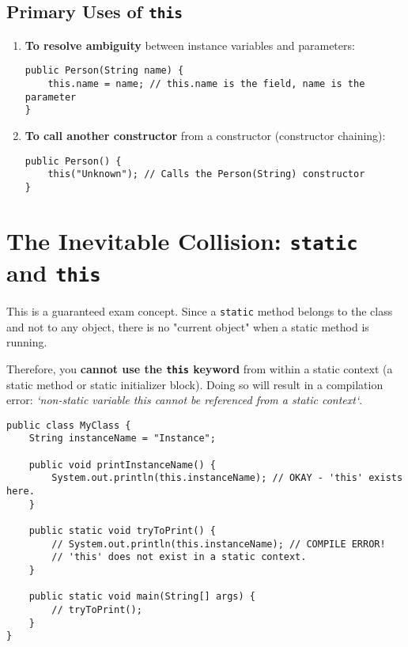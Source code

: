 \documentclass[12pt]{article}
\begin{document}
\begin{enumerate}[label=(\arabic*)]
\subsection*{Primary Uses of \texttt{this}}
\begin{enumerate}
    \item \textbf{To resolve ambiguity} between instance variables and parameters:
    \begin{verbatim}
public Person(String name) {
    this.name = name; // this.name is the field, name is the parameter
}
    \end{verbatim}
    \item \textbf{To call another constructor} from a constructor (constructor chaining):
    \begin{verbatim}
public Person() {
    this("Unknown"); // Calls the Person(String) constructor
}
    \end{verbatim}
\end{enumerate}

\section{The Inevitable Collision: \texttt{static} and \texttt{this}}
This is a guaranteed exam concept. Since a \texttt{static} method belongs to the class and not to any object, there is no "current object" when a static method is running.

Therefore, you \textbf{cannot use the \texttt{this} keyword} from within a static context (a static method or static initializer block). Doing so will result in a compilation error: \textit{`non-static variable this cannot be referenced from a static context`}.

\begin{verbatim}
public class MyClass {
    String instanceName = "Instance";

    public void printInstanceName() {
        System.out.println(this.instanceName); // OKAY - 'this' exists here.
    }

    public static void tryToPrint() {
        // System.out.println(this.instanceName); // COMPILE ERROR!
        // 'this' does not exist in a static context.
    }

    public static void main(String[] args) {
        // tryToPrint();
    }
}
\end{verbatim}


\end{enumerate}
\end{document}
